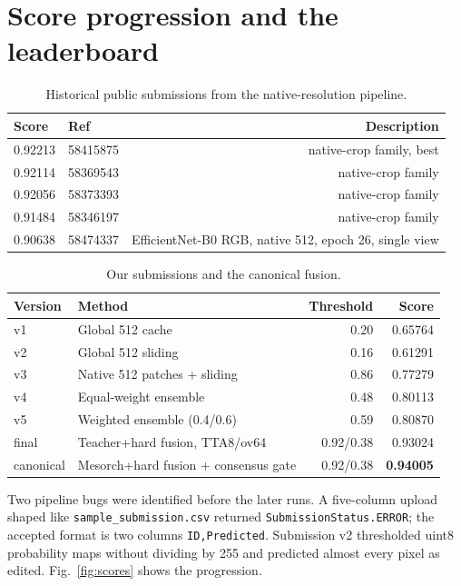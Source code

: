 \documentclass[10pt]{article}
\begin{document}
\section{Score progression and the leaderboard}
\begin{table}[htbp]\centering\footnotesize
\caption{Historical public submissions from the native-resolution pipeline.}
\label{tab:hist}
\begin{tabular}{llr}
\toprule Score & Ref & Description \\
\midrule
0.92213 & 58415875 & native-crop family, best \\
0.92114 & 58369543 & native-crop family \\
0.92056 & 58373393 & native-crop family \\
0.91484 & 58346197 & native-crop family \\
0.90638 & 58474337 & EfficientNet-B0 RGB, native 512, epoch 26, single view \\
\bottomrule
\end{tabular}
\end{table}
\begin{table}[htbp]\centering\footnotesize
\caption{Our submissions and the canonical fusion.}
\label{tab:ours}
\begin{tabular}{llrr}
\toprule Version & Method & Threshold & Score \\
\midrule
v1 & Global 512 cache & 0.20 & 0.65764 \\
v2 & Global 512 sliding & 0.16 & 0.61291 \\
v3 & Native 512 patches + sliding & 0.86 & 0.77279 \\
v4 & Equal-weight ensemble & 0.48 & 0.80113 \\
v5 & Weighted ensemble (0.4/0.6) & 0.59 & 0.80870 \\
final & Teacher+hard fusion, TTA8/ov64 & 0.92/0.38 & 0.93024 \\
canonical & Mesorch+hard fusion + consensus gate & 0.92/0.38 & \textbf{0.94005} \\
\bottomrule
\end{tabular}
\end{table}
Two pipeline bugs were identified before the later runs. A five-column upload shaped like \texttt{sample\_submission.csv} returned \texttt{SubmissionStatus.ERROR}; the accepted format is two columns \texttt{ID,Predicted}. Submission v2 thresholded uint8 probability maps without dividing by 255 and predicted almost every pixel as edited. Fig.~\ref{fig:scores} shows the progression.
\end{document}
